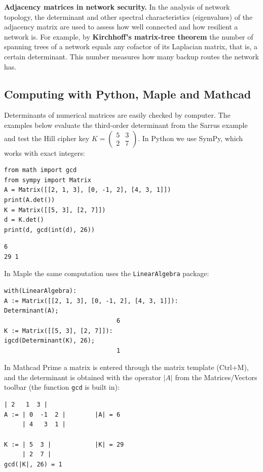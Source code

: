 \textbf{Adjacency matrices in network security.}
In the analysis of network topology, the determinant and other spectral
characteristics (eigenvalues) of the adjacency matrix are used to assess how
well connected and how resilient a network is. For example, by
\textbf{Kirchhoff’s matrix-tree theorem} the number of spanning trees of a network
equals any cofactor of its Laplacian matrix, that is, a certain determinant. This
number measures how many backup routes the network has.

\subsection{Computing with Python, Maple and Mathcad}
Determinants of numerical matrices are easily checked by computer. The examples
below evaluate the third-order determinant from the Sarrus example and test the
Hill cipher key $K=\begin{pmatrix}5&3\\2&7\end{pmatrix}$.
In Python we use SymPy, which works with exact integers:
\begin{Verbatim}[fontsize=\footnotesize,frame=single,label={\small Python}]
from math import gcd
from sympy import Matrix
A = Matrix([[2, 1, 3], [0, -1, 2], [4, 3, 1]])
print(A.det())
K = Matrix([[5, 3], [2, 7]])
d = K.det()
print(d, gcd(int(d), 26))
\end{Verbatim}
\begin{Verbatim}[fontsize=\footnotesize,frame=single,label={\small Output}]
6
29 1
\end{Verbatim}
In Maple the same computation uses the \texttt{LinearAlgebra} package:
\begin{Verbatim}[fontsize=\footnotesize,frame=single,label={\small Maple}]
with(LinearAlgebra):
A := Matrix([[2, 1, 3], [0, -1, 2], [4, 3, 1]]):
Determinant(A);
                               6
K := Matrix([[5, 3], [2, 7]]):
igcd(Determinant(K), 26);
                               1
\end{Verbatim}
In Mathcad Prime a matrix is entered through the matrix template (Ctrl+M), and
the determinant is obtained with the operator $|A|$ from the Matrices/Vectors
toolbar (the function \texttt{gcd} is built in):
\begin{Verbatim}[fontsize=\footnotesize,frame=single,label={\small Mathcad}]
     | 2   1  3 |
A := | 0  -1  2 |        |A| = 6
     | 4   3  1 |

K := | 5  3 |            |K| = 29
     | 2  7 |
gcd(|K|, 26) = 1
\end{Verbatim}

